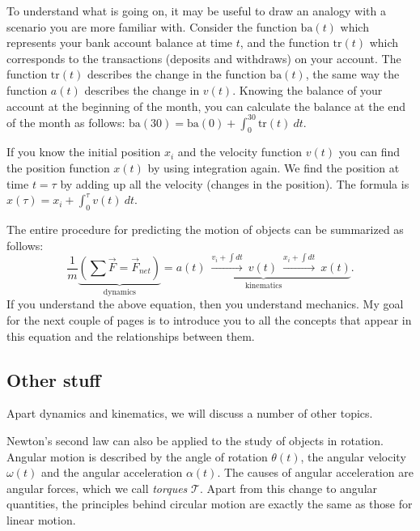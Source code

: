 \documentclass[letterpaper,9pt,journal]{IEEEtran}
\def\mcal{\mathcal}
\begin{document}
To understand what is going on, it may be useful to draw an analogy with a scenario you are more familiar with.
Consider the function $\textrm{ba}(t)$ which represents your bank account balance at time $t$,
and the function $\textrm{tr}(t)$ which corresponds to the transactions (deposits and withdraws) on your account.
The function $\textrm{tr}(t)$ describes the change in the function $\textrm{ba}(t)$,
the same way the function $a(t)$ describes the change in $v(t)$.
Knowing the balance of your account at the beginning of the month,
you can calculate the balance at the end of the month as follows: $\textrm{ba}(30)=\textrm{ba}(0)+\int_0^{30} \textrm{tr}(t)\:dt$.

If you know the initial position $x_i$ and the velocity function $v(t)$ you can find the position function $x(t)$ by using integration again.  
We find the position at time $t=\tau$ by adding up all the velocity (changes in the position). 
The formula is $x(\tau) = x_i + \int_0^\tau v(t)\:dt$.


The entire procedure for predicting the motion of objects can be summarized as follows:
\begin{equation}
\frac{1}{m} \underbrace{ \left( \sum \vec{F} = \vec{F}_{net}  \right) }_{\text{dynamics}} = \underbrace{ a(t) \ \overset{v_i+ \int\!dt }{\longrightarrow} \ v(t) \ \overset{x_i+ \int\!dt }{\longrightarrow} \ x(t) }_{\text{kinematics}}.
 \label{fma-eqn}
\end{equation}
%
If you understand the above equation, then you understand mechanics.
My goal for the next couple of pages is to introduce you to all the concepts that 
appear in this equation and the relationships between them. 




\vspace{-3mm}
\subsection{Other stuff}

Apart dynamics and kinematics, we will discuss a number of other topics.

Newton's second law can also be applied to the study of objects in rotation.
Angular motion is described by the angle of rotation $\theta(t)$, 
the angular velocity $\omega(t)$ and the angular acceleration $\alpha(t)$.
The causes of angular acceleration are angular forces, which we call \emph{torques} $\mathcal{T}$.
Apart from this change to angular quantities, the principles behind circular motion 
are exactly the same as those for linear motion.
\end{document}
